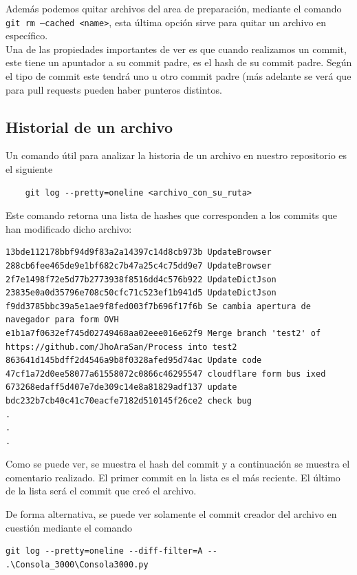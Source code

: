 Además podemos quitar archivos del area de preparación, mediante el comando \texttt{git rm --cached <name>}, esta última opción sirve para quitar un archivo en específico. \\

Una de las propiedades importantes de ver es que cuando realizamos un commit, este tiene un apuntador a su commit padre, es el hash de su commit padre. Según el tipo de commit este tendrá uno u otro commit padre (más adelante se verá que para pull requests pueden haber punteros distintos.

\subsection{Historial de un archivo}

Un comando útil para analizar la historia de un archivo en nuestro repositorio es el siguiente

\begin{verbatim}
    git log --pretty=oneline <archivo_con_su_ruta>
\end{verbatim}

Este comando retorna una lista de hashes que corresponden a los commits que han modificado dicho archivo:

\begin{verbatim}
13bde112178bbf94d9f83a2a14397c14d8cb973b UpdateBrowser
288cb6fee465de9e1bf682c7b47a25c4c75dd9e7 UpdateBrowser
2f7e1498f72e5d77b2773938f8516dd4c576b922 UpdateDictJson
23835e0a0d35796e708c50cfc71c523ef1b941d5 UpdateDictJson
f9dd3785bbc39a5e1ae9f8fed003f7b696f17f6b Se cambia apertura de navegador para form OVH
e1b1a7f0632ef745d02749468aa02eee016e62f9 Merge branch 'test2' of https://github.com/JhoAraSan/Process into test2
863641d145bdff2d4546a9b8f0328afed95d74ac Update code
47cf1a72d0ee58077a61558072c0866c46295547 cloudflare form bus ixed
673268edaff5d407e7de309c14e8a81829adf137 update
bdc232b7cb40c41c70eacfe7182d510145f26ce2 check bug
.
.
.
\end{verbatim}

Como se puede ver, se muestra el hash del commit y a continuación se muestra el comentario realizado. El primer commit en la lista es el más reciente. El último de la lista será el commit que creó el archivo. 

De forma alternativa, se puede ver solamente el commit creador del archivo en cuestión mediante el comando

\begin{verbatim}
git log --pretty=oneline --diff-filter=A -- .\Consola_3000\Consola3000.py
\end{verbatim}

